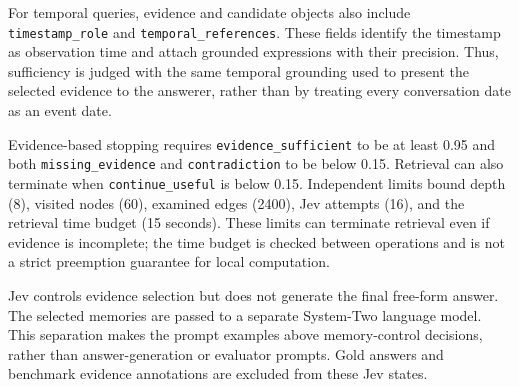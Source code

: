 \documentclass[11pt]{article}
\begin{document}
For temporal queries, evidence and candidate objects also include \texttt{timestamp\_role} and \texttt{temporal\_references}. These fields identify the timestamp as observation time and attach grounded expressions with their precision. Thus, sufficiency is judged with the same temporal grounding used to present the selected evidence to the answerer, rather than by treating every conversation date as an event date.

Evidence-based stopping requires \texttt{evidence\_sufficient} to be at least 0.95 and both \texttt{missing\_evidence} and \texttt{contradiction} to be below 0.15. Retrieval can also terminate when \texttt{continue\_useful} is below 0.15. Independent limits bound depth (8), visited nodes (60), examined edges (2400), Jev attempts (16), and the retrieval time budget (15 seconds). These limits can terminate retrieval even if evidence is incomplete; the time budget is checked between operations and is not a strict preemption guarantee for local computation.

Jev controls evidence selection but does not generate the final free-form answer. The selected memories are passed to a separate System-Two language model. This separation makes the prompt examples above memory-control decisions, rather than answer-generation or evaluator prompts. Gold answers and benchmark evidence annotations are excluded from these Jev states.
\end{document}
